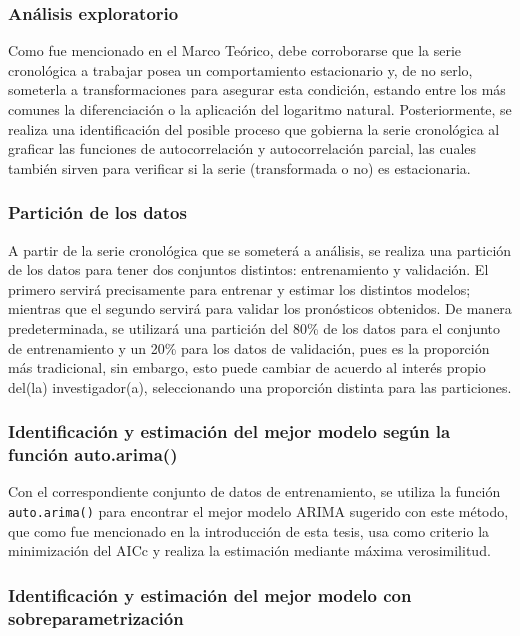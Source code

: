 \documentclass[
]{article}
\begin{document}
\subsubsection{Análisis exploratorio}

Como fue mencionado en el Marco Teórico, debe corroborarse que la serie
cronológica a trabajar posea un comportamiento estacionario y, de no
serlo, someterla a transformaciones para asegurar esta condición,
estando entre los más comunes la diferenciación o la aplicación del
logaritmo natural. Posteriormente, se realiza una identificación del
posible proceso que gobierna la serie cronológica al graficar las
funciones de autocorrelación y autocorrelación parcial, las cuales
también sirven para verificar si la serie (transformada o no) es
estacionaria.

\subsubsection{Partición de los datos}

A partir de la serie cronológica que se someterá a análisis, se realiza
una partición de los datos para tener dos conjuntos distintos:
entrenamiento y validación. El primero servirá precisamente para
entrenar y estimar los distintos modelos; mientras que el segundo
servirá para validar los pronósticos obtenidos. De manera
predeterminada, se utilizará una partición del 80\% de los datos para el
conjunto de entrenamiento y un 20\% para los datos de validación, pues
es la proporción más tradicional, sin embargo, esto puede cambiar de
acuerdo al interés propio del(la) investigador(a), seleccionando una
proporción distinta para las particiones.

\subsubsection{Identificación y estimación del mejor modelo según la función auto.arima()}

Con el correspondiente conjunto de datos de entrenamiento, se utiliza la
función \texttt{auto.arima()} para encontrar el mejor modelo ARIMA
sugerido con este método, que como fue mencionado en la introducción de
esta tesis, usa como criterio la minimización del AICc y realiza la
estimación mediante máxima verosimilitud.

\subsubsection{Identificación y estimación del mejor modelo con sobreparametrización}
\end{document}
